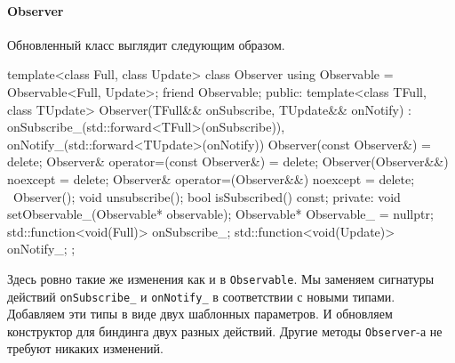 \paragraph{Observer}

Обновленный класс выглядит следующим образом.
\begin{cppcode}
template<class Full, class Update>
class Observer {
  using Observable = Observable<Full, Update>;
  friend Observable;
public:
  template<class TFull, class TUpdate>
  Observer(TFull&& onSubscribe, TUpdate&& onNotify)
    : onSubscribe_(std::forward<TFull>(onSubscribe)),
      onNotify_(std::forward<TUpdate>(onNotify)) {}
  Observer(const Observer&) = delete;
  Observer& operator=(const Observer&) = delete;
  Observer(Observer&&) noexcept = delete;
  Observer& operator=(Observer&&) noexcept = delete;
  ~Observer();
  void unsubscribe();
  bool isSubscribed() const;
private:
  void setObservable_(Observable* observable);
  Observable* Observable_ = nullptr;
  std::function<void(Full)> onSubscribe_;
  std::function<void(Update)> onNotify_;
};
\end{cppcode}
Здесь ровно такие же изменения как и в \verb"Observable".
Мы заменяем сигнатуры действий \verb"onSubscribe_" и \verb"onNotify_" в соответствии с новыми типами.
Добавляем эти типы в виде двух шаблонных параметров.
И обновляем конструктор для биндинга двух разных действий.
Другие методы \verb"Observer"-а не требуют никаких изменений.
